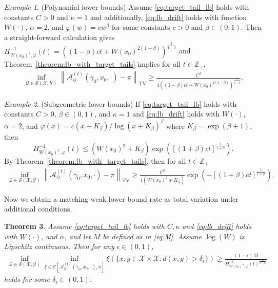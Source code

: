 \documentclass[12pt]{article}
\theoremstyle{plain}
\newtheorem{theorem}{Theorem}
\theoremstyle{remark}
\newtheorem{example}[theorem]{Example}
\newcommand{\norm}[1]{\left\lVert#1\right\rVert}
\newcommand{\e}{\epsilon}
\newcommand{\Z}{\mathbb{Z}}
\newcommand{\Q}{\mathcal{Q}}
\newcommand{\A}{\mathcal{A}}
\newcommand{\X}{\mathcal{X}}
\newcommand{\Y}{\mathcal{Y}}
\newcommand{\C}{\mathcal{C}}
\renewcommand{\S}{\mathcal{S}}
\let\temp\phi
\let\phi\varphi
\let\varphi\temp
\newcommand{\eq}[1]{\begin{align*}#1\end{align*}}
\begin{document}
\begin{example}
(Polynomial lower bounds)
Assume \eqref{eq:target_tail_lb} holds with constants $C > 0$ and $\kappa = 1$ and additionally, \eqref{eq:lb_drift} holds with function $W(\cdot)$, $\alpha = 2$, and $\phi(w) = c w^\beta$ for some constants $c > 0$ and $\beta \in (0, 1)$. Then a straight-forward calculation gives
$
H^{-1}_{W(x_0)^2, \phi}(t) = \left( (1 - \beta) c t + W(x_0)^{2( 1-\beta )} \right)^{\frac{1}{1 - \beta}}
$
and Theorem~\ref{theorem:lb_with_target_tails} implies for all $t \in \Z_+$,
\eq{
\inf_{\Q \in \S(\X, \Y) }
\norm{ \A_\Q^{(t)}(\gamma_0, x_0, \cdot) - \pi }_{\text{TV}}
\ge \frac{C^2}{ 4 \left( (1 - \beta) c t + W(x_0)^{2( 1-\beta )} \right)^{\frac{1}{1 - \beta}} }.
}
\end{example}

\begin{example}
(Subgeometric lower bounds)
If \eqref{eq:target_tail_lb} holds with constants $C > 0$, $\beta \in (0, 1)$, and $\kappa = 1$ and \eqref{eq:lb_drift} holds with $W(\cdot)$, $\alpha = 2$, and $\phi(x) = c (x + K_\beta)/\log(x + K_\beta )^\beta$ where $K_\beta = \exp(\beta + 1)$, then
\[
H^{-1}_{W(x_0)^2, \phi}(t)
\le (W(x_0)^2 + K_\beta) \exp\left( [ (1 + \beta) c t ]^\frac{1}{1 + \beta} \right).
\]
By Theorem~\ref{theorem:lb_with_target_tails}, then for all $t \in \Z_+$
\eq{
\inf_{\Q \in \S(\X, \Y) }
\norm{ \A_\Q^{(t)}(\gamma_0, x_0, \cdot) - \pi }_{\text{TV}}
\ge \frac{C^2 }{ 4(W(x_0)^2 + K_\beta) } \exp\left( -[ (1 + \beta) c t ]^\frac{1}{1 + \beta} \right).
}
\end{example}

Now we obtain a matching weak lower bound rate as total variation under additional conditions.

\begin{theorem}
\label{theorem:weak_lb_with_target_tails}
Assume \eqref{eq:target_tail_lb} holds with $C, \kappa$ and \eqref{eq:lb_drift} holds with $W(\cdot)$, and $\alpha$, and let $M$ be defined as in \eqref{eq:M}.
Assume $\log(W)$ is Lipschitz continuous.
Then for any $\e \in (0, 1)$,
\begin{align*}
\inf_{\Q \in \S(\X, \Y)} \inf_{\xi \in \C\left[ \A_{\Q}^{(t)}(\gamma_0, x_0, \cdot), \pi \right] } \xi( \{ x, y \in \X \times \X : d(x, y) > \delta_{\e} \})
\ge \frac{(1 - \e) M}{ H_{W(x_0)^\alpha, \phi}^{-1}(t)^{\frac{\kappa}{\alpha - \kappa}} }
\end{align*}
holds for some $\delta_{\e} \in (0, 1)$.
\end{theorem}
\end{document}
